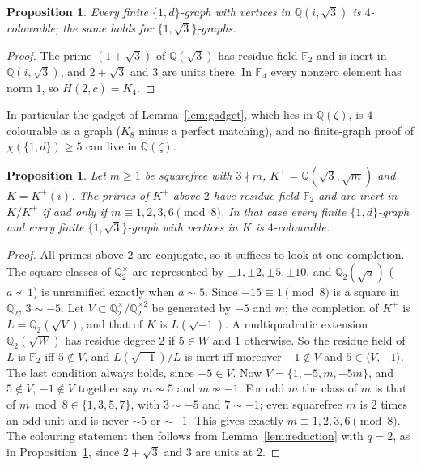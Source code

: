 \documentclass[11pt,a4paper]{amsart}
\newtheorem{proposition}[theorem]{Proposition}
\theoremstyle{remark}
\newcommand{\Q}{\mathbb{Q}}
\newcommand{\F}{\mathbb{F}}
\begin{document}
\begin{proposition}\label{prop:zeta12}
Every finite $\{1,d\}$-graph with vertices in $\Q(i,\sqrt3)$ is $4$-colourable; the same holds for $\{1,\sqrt3\}$-graphs.
\end{proposition}

\begin{proof}
The prime $(1+\sqrt3)$ of $\Q(\sqrt3)$ has residue field $\F_2$ and is inert in $\Q(i,\sqrt3)$, and $2+\sqrt3$ and $3$ are units there. In $\F_4$ every nonzero element has norm $1$, so $H(2,c)=K_4$.
\end{proof}

In particular the gadget of Lemma~\ref{lem:gadget}, which lies in $\Q(\zeta)$, is $4$-colourable as a graph ($K_8$ minus a perfect matching), and no finite-graph proof of $\chi(\{1,d\})\ge5$ can live in $\Q(\zeta)$.

\begin{proposition}\label{prop:mod8}
Let $m\ge1$ be squarefree with $3\nmid m$, $K^+=\Q(\sqrt3,\sqrt m)$ and $K=K^+(i)$. The primes of $K^+$ above $2$ have residue field $\F_2$ and are inert in $K/K^+$ if and only if $m\equiv1,2,3,6\pmod 8$. In that case every finite $\{1,d\}$-graph and every finite $\{1,\sqrt3\}$-graph with vertices in $K$ is $4$-colourable.
\end{proposition}

\begin{proof}
All primes above $2$ are conjugate, so it suffices to look at one completion. The square classes of $\Q_2^\times$ are represented by $\pm1,\pm2,\pm5,\pm10$, and $\Q_2(\sqrt a)$ ($a\not\sim1$) is unramified exactly when $a\sim5$. Since $-15\equiv1\pmod8$ is a square in $\Q_2$, $3\sim-5$. Let $V\subset\Q_2^\times/\Q_2^{\times2}$ be generated by $-5$ and $m$; the completion of $K^+$ is $L=\Q_2(\sqrt V)$, and that of $K$ is $L(\sqrt{-1})$. A multiquadratic extension $\Q_2(\sqrt W)$ has residue degree $2$ if $5\in W$ and $1$ otherwise. So the residue field of $L$ is $\F_2$ iff $5\notin V$, and $L(\sqrt{-1})/L$ is inert iff moreover $-1\notin V$ and $5\in\langle V,-1\rangle$. The last condition always holds, since $-5\in V$. Now $V=\{1,-5,m,-5m\}$, and $5\notin V$, $-1\notin V$ together say $m\not\sim5$ and $m\not\sim-1$. For odd $m$ the class of $m$ is that of $m\bmod 8\in\{1,3,5,7\}$, with $3\sim-5$ and $7\sim-1$; even squarefree $m$ is $2$ times an odd unit and is never $\sim5$ or $\sim-1$. This gives exactly $m\equiv1,2,3,6\pmod8$. The colouring statement then follows from Lemma~\ref{lem:reduction} with $q=2$, as in Proposition~\ref{prop:zeta12}, since $2+\sqrt3$ and $3$ are units at $2$.
\end{proof}
\end{document}
